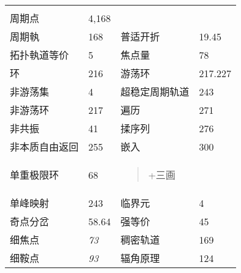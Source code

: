 \documentclass{article}
\begin{document}
\begin{longtable}[]{@{}llll@{}}
\begin{minipage}[t]{0.22\columnwidth}
\strut
\end{minipage}\tabularnewline
周期点 & 4,168 & &\tabularnewline
周期執 & 168 & 普适开折 & 19.45\tabularnewline
拓扑執道等价 & 5 & 焦点量 & 78\tabularnewline
环 & 216 & 游荡环 & 217.227\tabularnewline
非游荡集 & 4 & 超稳定周期轨道 & 243\tabularnewline
非游荡环 & 217 & 遍历 & 271\tabularnewline
非共振 & 41 & 揉序列 & 276\tabularnewline
非本质自由返回 & 255 & 嵌入 & 300\tabularnewline
\begin{minipage}[t]{0.22\columnwidth}\raggedright
单重极限环\strut
\end{minipage} & \begin{minipage}[t]{0.22\columnwidth}\raggedright
68\strut
\end{minipage} & \begin{minipage}[t]{0.22\columnwidth}\raggedright
\begin{quote}
+三画
\end{quote}\strut
\end{minipage} & \begin{minipage}[t]{0.22\columnwidth}\raggedright
\strut
\end{minipage}\tabularnewline
单峰映射 & 243 & 临界元 & 4\tabularnewline
奇点分岔 & 58.64 & 强等价 & 45\tabularnewline
细焦点 & \emph{73} & 稠密轨道 & 169\tabularnewline
细鞍点 & \emph{93} & 辐角原理 & 124\tabularnewline
\bottomrule
\end{longtable}
\end{document}
